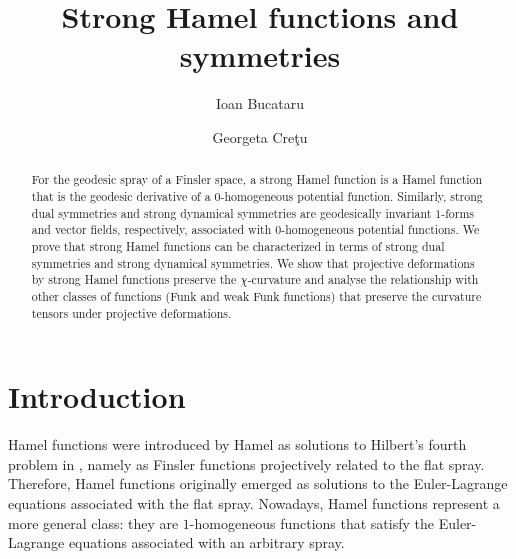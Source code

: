 \documentclass[oneside,english]{amsart}
\theoremstyle{definition}
\theoremstyle{plain}
\theoremstyle{plain}
\theoremstyle{plain}
\theoremstyle{remark}
\theoremstyle{remark}
\theoremstyle{remark}
\begin{document}
\title[Strong Hamel functions and symmetries]{Strong Hamel functions and symmetries}

\author[Bucataru]{Ioan Bucataru}
\address{Faculty of  Mathematics \\ Alexandru Ioan Cuza University \\ Ia\c si, 
  Romania}

\author[Cre\c tu]{Georgeta Cre\c tu}
\address{Department of  Mathematics \\ Gheorghe Asachi Technical University \\ Ia\c si, 
  Romania}

\begin{abstract}
For the geodesic spray of a Finsler space, a strong Hamel function is a Hamel function that is the geodesic derivative of a $0$-homogeneous potential function. Similarly, strong dual symmetries and strong dynamical symmetries are geodesically invariant $1$-forms and vector fields, respectively, associated with $0$-homogeneous potential functions. We prove that strong Hamel functions can be characterized in terms of strong dual symmetries and strong dynamical symmetries. We show that projective deformations by strong Hamel functions preserve the $\chi$-curvature and analyse the relationship with other classes of functions (Funk and weak Funk functions) that preserve the curvature tensors under projective deformations.
\end{abstract}

  
  \maketitle
\section{Introduction}
Hamel functions were introduced by Hamel as solutions to Hilbert's fourth problem in \cite{Hamel03}, namely as Finsler functions projectively related to the flat spray. Therefore, Hamel functions originally emerged as solutions to the Euler-Lagrange equations associated with the flat spray. Nowadays, Hamel functions represent a more general class: they are $1$-homogeneous functions that satisfy the Euler-Lagrange equations associated with an arbitrary spray.      
\end{document}
